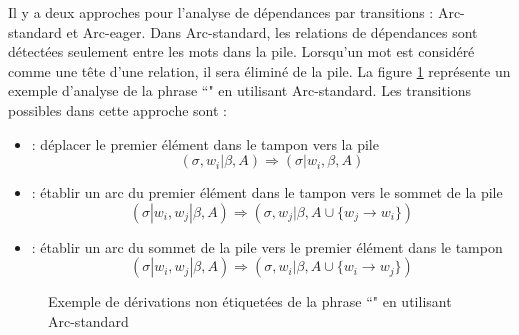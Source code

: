 \documentclass{KodeBook}
\begin{document}
Il y a deux approches pour l'analyse de dépendances par transitions : Arc-standard et Arc-eager. 
Dans Arc-standard, les relations de dépendances sont détectées seulement entre les mots dans la pile. 
Lorsqu'un mot est considéré comme une tête d'une relation, il sera éliminé de la pile. 
La figure \ref{fig:arc-standard-exp} représente un exemple d'analyse de la phrase ``" en utilisant Arc-standard.
Les transitions possibles dans cette approche sont :
\begin{itemize}
	\item {} : déplacer le premier élément dans le tampon vers la pile 
	\[ (\sigma, w_i|\beta, A) \Rightarrow  (\sigma|w_i, \beta, A) \]
	
	\item {} : établir un arc du premier élément dans le tampon vers le sommet de la pile
	\[ (\sigma|w_i, w_j|\beta, A) \Rightarrow  (\sigma, w_j|\beta, A \cup \{w_j \rightarrow w_i \}) \] 
	
	\item {} : établir un arc du sommet de la pile vers le premier élément dans le tampon
	\[ (\sigma|w_i, w_j|\beta, A) \Rightarrow  (\sigma, w_i|\beta, A \cup \{w_i \rightarrow w_j \}) \] 
\end{itemize}

\begin{figure}[ht]
	\centering
	\caption[Exemple de dérivations non étiquetées en utilisant Arc-standard]{Exemple de dérivations non étiquetées de la phrase ``" en utilisant Arc-standard \cite{2018-eisenstein}\label{fig:arc-standard-exp}}
\end{figure}
\end{document}
